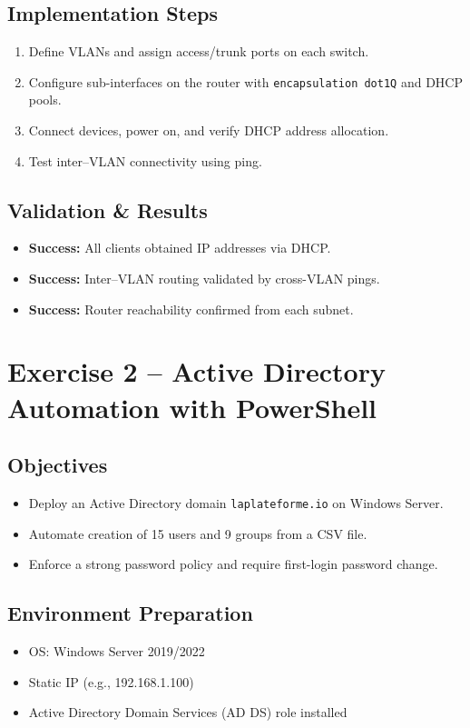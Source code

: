 \documentclass[11pt,a4paper]{article}
\begin{document}
\subsection{Implementation Steps}
\begin{enumerate}
  \item Define VLANs and assign access/trunk ports on each switch.
  \item Configure sub-interfaces on the router with \texttt{encapsulation dot1Q} and DHCP pools.
  \item Connect devices, power on, and verify DHCP address allocation.
  \item Test inter–VLAN connectivity using ping.
\end{enumerate}

\subsection{Validation \& Results}
\begin{itemize}
  \item \textbf{Success:} All clients obtained IP addresses via DHCP.
  \item \textbf{Success:} Inter–VLAN routing validated by cross-VLAN pings.
  \item \textbf{Success:} Router reachability confirmed from each subnet.
\end{itemize}

\section{Exercise 2 – Active Directory Automation with PowerShell}
\subsection{Objectives}
\begin{itemize}
  \item Deploy an Active Directory domain \texttt{laplateforme.io} on Windows Server.
  \item Automate creation of 15 users and 9 groups from a CSV file.
  \item Enforce a strong password policy and require first-login password change.
\end{itemize}

\subsection{Environment Preparation}
\begin{itemize}
  \item OS: Windows Server 2019/2022
  \item Static IP (e.g., 192.168.1.100)
  \item Active Directory Domain Services (AD DS) role installed
\end{itemize}
\end{document}
